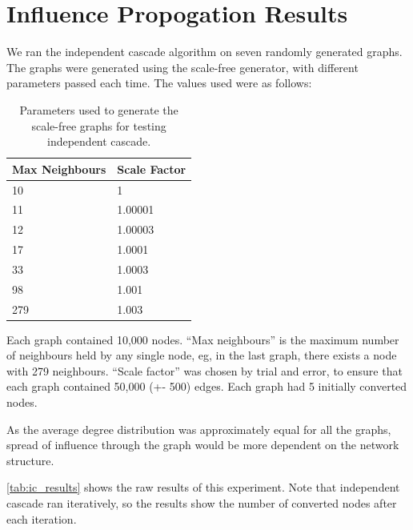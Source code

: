 \section{Influence Propogation Results}

We ran the independent cascade algorithm on seven randomly generated graphs. The graphs were generated using the scale-free generator, with different parameters passed each time. The values used were as follows:

\begin{table}
\centering
\begin{tabular}{|l|l|}
\hline
Max Neighbours & Scale Factor \\
\hline
10 & 1 \\
11 & 1.00001 \\
12 & 1.00003 \\
17 & 1.0001 \\
33 & 1.0003 \\
98 & 1.001 \\
279 & 1.003 \\
\hline
\end{tabular}
\caption{Parameters used to generate the scale-free graphs for testing independent cascade.}
\label{tab:ic_graphs}
\end{table}

Each graph contained 10,000 nodes. ``Max neighbours'' is the maximum number of neighbours held by any single node, eg, in the last graph, there exists a node with 279 neighbours. ``Scale factor'' was chosen by trial and error, to ensure that each graph contained 50,000 (+- 500) edges. Each graph had 5 initially converted nodes.

As the average degree distribution was approximately equal for all the graphs, spread of influence through the graph would be more dependent on the network structure.

\ref{tab:ic_results} shows the raw results of this experiment. Note that independent cascade ran iteratively, so the results show the number of converted nodes after each iteration.

